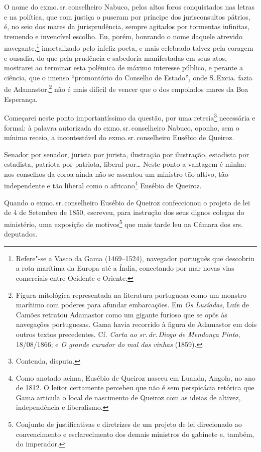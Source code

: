O nome do exmo.\,sr.\,conselheiro Nabuco, pelos altos foros conquistados
nas letras e na política, que com justiça o puseram por príncipe dos
jurisconsultos pátrios, é, no seio dos mares da jurisprudência, sempre
agitados por tormentas infinitas, tremendo e invencível escolho. Eu,
porém, honrando o nome daquele atrevido navegante,\footnote{Refere"-se a
  Vasco da Gama (1469--1524), navegador português que descobriu a rota
  marítima da Europa até a Índia, conectando por mar novas vias
  comerciais entre Ocidente e Oriente.} imortalizado pelo infeliz
poeta, e mais celebrado talvez pela coragem e ousadia, do que pela
prudência e sabedoria manifestadas em seus atos, mostrarei ao terminar
esta polêmica de máximo interesse público, e perante a ciência, que o
imenso ``promontório do Conselho de Estado'', onde S.\,Excia. fazia de
Adamastor,\footnote{Figura mitológica representada na literatura
  portuguesa como um monstro marítimo com poderes para afundar
  embarcações. Em \emph{Os Lusíadas}, Luís de Camões retratou Adamastor
  como um gigante furioso que se opôs às navegações portuguesas. Gama
  havia recorrido à figura de Adamastor em dois outros textos
  precedentes. Cf. \emph{Carta ao sr.\,dr.\,Diogo de Mendonça Pinto},
  18/08/1866; e \emph{O grande curador do mal das vinhas} (1859).} não
é mais difícil de vencer que o dos empolados mares da Boa Esperança.

Começarei neste ponto importantíssimo da questão, por uma
retesia\footnote{Contenda, disputa.} necessária e formal: à palavra
autorizada do exmo.\,sr.\,conselheiro Nabuco, oponho, sem o mínimo receio,
a incontestável do exmo.\,sr.\,conselheiro Eusébio de Queiroz.

Senador por senador, jurista por jurista, ilustração por ilustração,
estadista por estadista, patriota por patriota, liberal por\ldots{} Neste
ponto a vantagem é minha: nos conselhos da coroa ainda não se assentou
um ministro tão altivo, tão independente e tão liberal como o
africano\footnote{Como anotado acima, Eusébio de Queiroz nasceu em
  Luanda, Angola, no ano de 1812. O leitor certamente percebeu que não é
  sem perspicácia retórica que Gama articula o local de nascimento de
  Queiroz com as ideias de altivez, independência e liberalismo.}
Eusébio de Queiroz.

Quando o exmo.\,sr.\,conselheiro Eusébio de Queiroz confeccionou o projeto
de lei de 4 de Setembro de 1850, escreveu, para instrução dos seus
dignos colegas do ministério, uma exposição de motivos\footnote{
  Conjunto de justificativas e diretrizes de um projeto de lei
  direcionado ao convencimento e esclarecimento dos demais ministros do
  gabinete e, também, do imperador.} que mais tarde leu na Câmara dos
srs.\,deputados.

